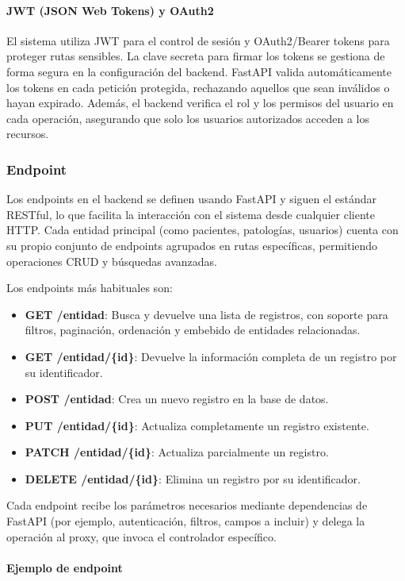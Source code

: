 \documentclass[12pt, a4paper]{article}
\begin{document}
\paragraph{JWT (JSON Web Tokens) y OAuth2}
El sistema utiliza JWT para el control de sesión y OAuth2/Bearer tokens para proteger rutas sensibles. La clave secreta para firmar los tokens se gestiona de forma segura en la configuración del backend. FastAPI valida automáticamente los tokens en cada petición protegida, rechazando aquellos que sean inválidos o hayan expirado. Además, el backend verifica el rol y los permisos del usuario en cada operación, asegurando que solo los usuarios autorizados acceden a los recursos.

\subsubsection{Endpoint}

Los endpoints en el backend se definen usando FastAPI y siguen el estándar RESTful, lo que facilita la interacción con el sistema desde cualquier cliente HTTP. Cada entidad principal (como pacientes, patologías, usuarios) cuenta con su propio conjunto de endpoints agrupados en rutas específicas, permitiendo operaciones CRUD y búsquedas avanzadas.

Los endpoints más habituales son:
\begin{itemize}
	\item \textbf{GET /entidad}: Busca y devuelve una lista de registros, con soporte para filtros, paginación, ordenación y embebido de entidades relacionadas.
	\item \textbf{GET /entidad/\{id\}}: Devuelve la información completa de un registro por su identificador.
	\item \textbf{POST /entidad}: Crea un nuevo registro en la base de datos.
	\item \textbf{PUT /entidad/\{id\}}: Actualiza completamente un registro existente.
	\item \textbf{PATCH /entidad/\{id\}}: Actualiza parcialmente un registro.
	\item \textbf{DELETE /entidad/\{id\}}: Elimina un registro por su identificador.
\end{itemize}

Cada endpoint recibe los parámetros necesarios mediante dependencias de FastAPI (por ejemplo, autenticación, filtros, campos a incluir) y delega la operación al proxy, que invoca el controlador específico.

\paragraph{Ejemplo de endpoint}
\end{document}

